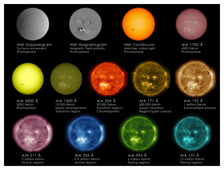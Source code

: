 \documentclass[a4paper]{article}            %
\begin{document}
\begin{slidetop}
    \begin{center}
        \includegraphics[width=0.85\textwidth]{sdo.jpg}%
    \end{center}
    
\end{slidetop}

\begin{slidetop}
    
\end{slidetop}
\end{document}
